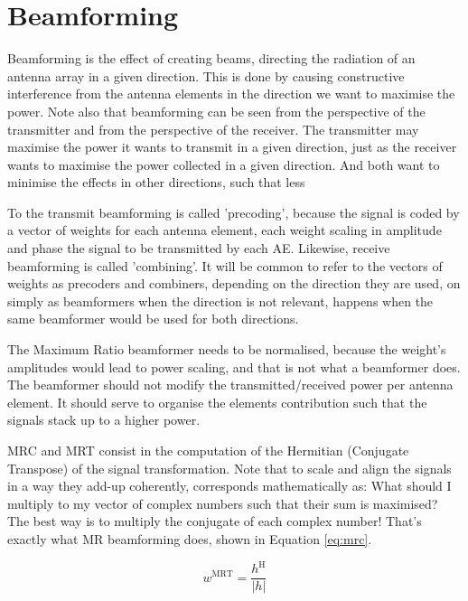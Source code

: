 \label{ap:b}

\section{Beamforming}
Beamforming is the effect of creating beams, directing the radiation of an antenna array in a given direction. This is done by causing constructive interference from the antenna elements in the direction we want to maximise the power. Note also that beamforming can be seen from the perspective of the transmitter and from the perspective of the receiver. The transmitter may maximise the power it wants to transmit in a given direction, just as the receiver wants to maximise the power collected in a given direction. And both want to minimise the effects in other directions, such that less 

To the transmit beamforming is called 'precoding', because the signal is coded by a vector of weights for each antenna element, each weight scaling in amplitude and phase the signal to be transmitted by each AE. Likewise, receive beamforming is called 'combining'. It will be common to refer to the vectors of weights as precoders and combiners, depending on the direction they are used, on simply as beamformers when the direction is not relevant, happens when the same beamformer would be used for both directions.


The Maximum Ratio beamformer \cite{795811} needs to be normalised, because the weight's amplitudes would lead to power scaling, and that is not what a beamformer does. The beamformer should not modify the transmitted/received power per antenna element. It should serve to organise the elements contribution such that the signals stack up to a higher power.


MRC and MRT consist in the computation of the Hermitian (Conjugate Transpose) of the signal transformation. Note that to scale and align the signals in a way they add-up coherently, corresponds mathematically as: What should I multiply to my vector of complex numbers such that their sum is maximised? The best way is to multiply the conjugate of each complex number! That's exactly what MR beamforming does, shown in Equation \eqref{eq:mrc}.

\begin{equation} \label{eq:mrc}
    w^\text{MRT} = \frac{h^\text{H}}{|h|}
\end{equation}


